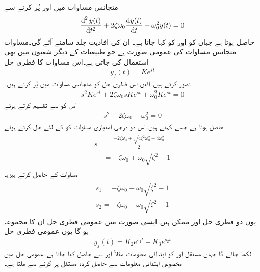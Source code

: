 متجانس مساوات میں  اور  پُر کرنے سے
\begin{align}\label{مساوات_عارضی_دو_درجی_عمومی_ہم_جنسی_ب}
\frac{\dif^{\,2} y(t)}{\dif t^2}+2\zeta \omega_0\frac{\dif y(t)}{\dif t}+\omega_0^2 y(t)=0
\end{align}
حاصل ہوتا ہے جہاں  کو 
 اور  کو  کہا جاتا ہے۔ ان کی افادیت جلد سامنے آئے گی۔مساوات   متجانس مساوات کی عمومی صورت ہے جو طبیعیات کے دیگر شعبوں میں بھی استعمال کی جاتی ہے۔اس مساوات کا فطری حل
\begin{align*}
y_f(t)=Ke^{st}
\end{align*}
تصور کرتے ہیں۔آئیں اس فطری حل کو متجانس مساوات میں پُر کرتے ہیں۔
\begin{align*}
s^2 K e^{st}+2\zeta\omega_0 s K e^{st}+\omega_0^2 K e^{st}=0
\end{align*}
اس کو  سے تقسیم کرتے ہوئے
\begin{align}
s^2+2\zeta\omega_0+\omega_0^2=0
\end{align}
حاصل ہوتا ہے جسے  کہتے ہیں۔اس دو درجی امتیازی مساوات کو  کے لئے حل کرتے ہوئے
\begin{gather}
\begin{aligned}
s&=\frac{-2\zeta\omega_0\mp\sqrt{4\zeta^2\omega_0^2-4\omega_0^2}}{2}\\
&=-\zeta\omega_0\mp \omega_0\sqrt{\zeta^2-1}
\end{aligned}
\end{gather}
مساوات کے  حاصل کرتے ہیں۔
\begin{gather}
\begin{aligned}\label{مساوات_عارضی_دو_درجی_ہم_سمتی_عمومی_حل_الف}
s_1=-\zeta\omega_0+ \omega_0\sqrt{\zeta^2-1}\\
s_2=-\zeta\omega_0- \omega_0\sqrt{\zeta^2-1}
\end{aligned}
\end{gather}
یوں دو فطری حل  اور  ممکن ہیں۔ایسی صورت میں عمومی فطری حل ان کا مجموعہ ہو گا
یوں عمومی فطری حل
\begin{align}
y_f(t)=K_2 e^{s_1 t}+K_3 e^{s_2 t}
\end{align}
لکھا جائے گا جہاں مستقل  اور  کو ابتدائی معلومات مثلاً  اور  سے حاصل کیا جاتا ہے۔عمومی حل میں مخصوص ابتدائی معلومات سے حاصل کردہ مستقل پر کرنے سے  ملتا ہے۔

